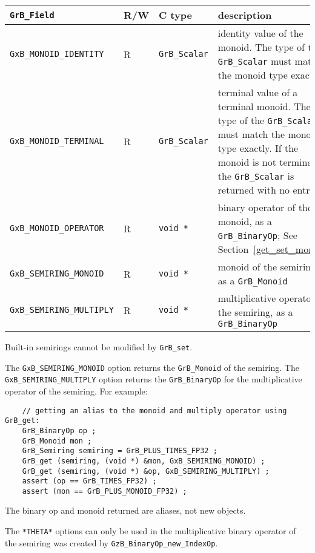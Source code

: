 \noindent
{\small
\begin{tabular}{|l|l|l|p{2.5in}|}
\hline
\verb'GrB_Field'                    & R/W  & C type        & description \\
\hline
\verb'GxB_MONOID_IDENTITY'          & R  & \verb'GrB_Scalar' &
    identity value of the monoid.  The type of the \verb'GrB_Scalar'
    must match the monoid type exactly. \\
\verb'GxB_MONOID_TERMINAL'          & R  & \verb'GrB_Scalar' &
    terminal value of a terminal monoid.  The type of the \verb'GrB_Scalar'
    must match the monoid type exactly.  If the monoid is not terminal,
    the \verb'GrB_Scalar' is returned with no entry. \\
\hline
\verb'GxB_MONOID_OPERATOR'          & R  & \verb'void *' &
    binary operator of the monoid, as a \verb'GrB_BinaryOp';
    See Section~\ref{get_set_monoid} \\
\verb'GxB_SEMIRING_MONOID'          & R  & \verb'void *' &
    monoid of the semiring, as a \verb'GrB_Monoid' \\
\verb'GxB_SEMIRING_MULTIPLY'        & R  & \verb'void *' &
    multiplicative operator of the semiring, as a \verb'GrB_BinaryOp' \\
\hline
\end{tabular}
}

Built-in semirings cannot be modified by \verb'GrB_set'.

The \verb'GxB_SEMIRING_MONOID' option returns the \verb'GrB_Monoid' of the
semiring.  The \verb'GxB_SEMIRING_MULTIPLY' option returns the
\verb'GrB_BinaryOp' for the multiplicative operator of the semiring.  For
example:

    {\footnotesize
    \begin{verbatim}
    // getting an alias to the monoid and multiply operator using GrB_get:
    GrB_BinaryOp op ;
    GrB_Monoid mon ;
    GrB_Semiring semiring = GrB_PLUS_TIMES_FP32 ;
    GrB_get (semiring, (void *) &mon, GxB_SEMIRING_MONOID) ;
    GrB_get (semiring, (void *) &op, GxB_SEMIRING_MULTIPLY) ;
    assert (op == GrB_TIMES_FP32) ;
    assert (mon == GrB_PLUS_MONOID_FP32) ; \end{verbatim} }

The binary op and monoid returned are aliases, not new objects.

The \verb'*THETA*' options can only be used in the multiplicative binary
operator of the semiring was created by \verb'GzB_BinaryOp_new_IndexOp'.

\newpage

